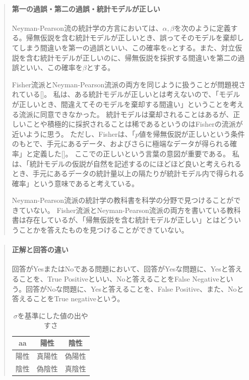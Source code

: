 \begin{mybox}
    \begin{quote}
    \paragraph{第一の過誤・第二の過誤・統計モデルが正しい}
        Neyman-Pearson流の統計学の方言においては、$\alpha,\beta$を次のように定義する。帰無仮説を含む統計モデルが正しいとき、誤ってそのモデルを棄却してしまう間違いを第一の過誤といい、この確率を$\alpha$とする。また、対立仮説を含む統計モデルが正しいのに、帰無仮説を採択する間違いを第二の過誤といい、この確率を$\beta$とする。

        Fisher流派とNeyman-Pearson流派の両方を同じように扱うことが問題視されている[\cite{published_papers/18436201}]。
        私は、ある統計モデルが正しいとは考えないので、「モデルが正しいとき、間違えてそのモデルを棄却する間違い」ということを考える流派に同意できなかった。
        統計モデルは棄却されることはあるが、正しいことや積極的に採択されることは稀であるというのはFisherの流派が近いように思う。
        ただし、Fisherは、「$p$値を帰無仮説が正しいという条件のもとで、手元にあるデータ、およびさらに極端なデータが得られる確率」と定義した[\cite{1573106361610039296}]。
        ここでの正しいという言葉の意図が重要である。
        私は、「統計モデルの仮説が自然を記述するのにほどほど良いと考えられるとき、手元にあるデータの統計量以上の隔たりが統計モデル内で得られる確率」という意味であると考えている。

        Neyman-Pearson流派の統計学の教科書を科学の分野で見つけることができていない。
        Fisher流派とNeyman-Pearson流派の両方を書いている教科書は存在しているが、「帰無仮説を含む統計モデルが正しい」とはどういうことかを答えたものを見つけることができていない。
    \end{quote}
\end{mybox}

\begin{mybox}
    \begin{quote}
    \paragraph{正解と回答の違い}
    回答がYesまたはNoである問題において、回答がYesな問題に、Yesと答えることを、True Positiveといい、Noと答えることをFalse Negativeという。回答がNoな問題に、Yesと答えることを、False Positive、また、Noと答えることをTrue negativeという。
    \begin{table}[hbtp]
        \caption{$\sigma$を基準にした値の出やすさ}
        \centering
        \begin{tabular}{ccc}
            \hline
            aa  & 陽性  &  陰性 \\
            \hline \hline
            陽性 & 真陽性 & 偽陽性  \\
            陰性 & 偽陰性 & 真陰性\\
        \end{tabular}
    \end{table}
    \fi
    \end{quote}
\end{mybox}


